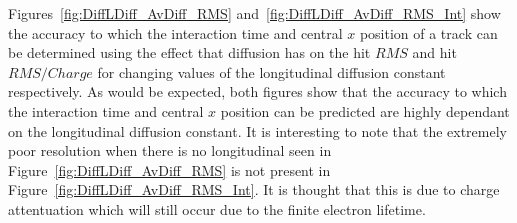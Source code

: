 Figures~\ref{fig:DiffLDiff_AvDiff_RMS} and~\ref{fig:DiffLDiff_AvDiff_RMS_Int} show the accuracy to which the interaction time and central $x$ position of a track can be determined using the effect that diffusion has on the hit $RMS$ and hit $RMS/Charge$ for changing values of the longitudinal diffusion constant respectively. As would be expected, both figures show that the accuracy to which the interaction time and central $x$ position can be predicted are highly dependant on the longitudinal diffusion constant. It is interesting to note that the extremely poor resolution when there is no longitudinal seen in Figure~\ref{fig:DiffLDiff_AvDiff_RMS} is not present in Figure~\ref{fig:DiffLDiff_AvDiff_RMS_Int}. It is thought that this is due to charge attentuation which will still occur due to the finite electron lifetime.  

